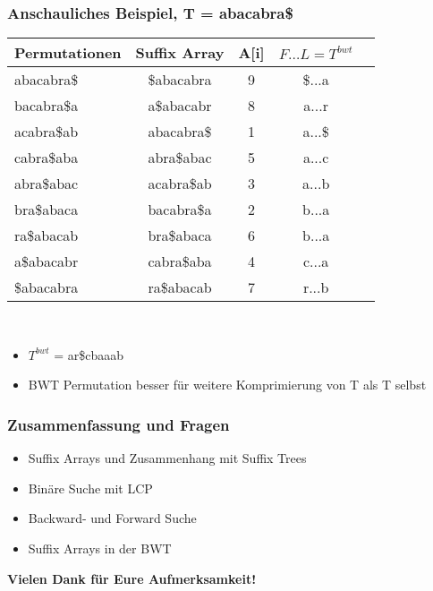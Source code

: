 \documentclass{beamer}
\begin{document}
\begin{frame}
\frametitle{Anschauliches Beispiel, T = \glqq abacabra\$\grqq}
\begin{tabular}{l<{\ttfamily} |c<{\ttfamily} |cc<{\ttfamily}| r<{\ttfamily}}
\textbf{Permutationen} & \textbf{Suffix Array} & A[i] & $F\ldots L = T^{bwt}$ \\\hline
abacabra\$ & \$\color{gray}abacabra &9& \$...a \\
bacabra\$\color{gray}a & a\$\color{gray}abacabr &8& a...r \\
acabra\$\color{gray}ab & abacabra\$ & 1&a...\$ \\
cabra\$\color{gray}aba & abra\$\color{gray}abac &5& a...c \\
abra\$\color{gray}abac & acabra\$\color{gray}ab &3& a...b \\
bra\$\color{gray}abaca & bacabra\$\color{gray}a & 2&b...a \\
ra\$\color{gray}abacab & bra\$\color{gray}abaca &6& b...a \\
a\$\color{gray}abacabr & cabra\$\color{gray}aba & 4&c...a \\
\$\color{gray}abacabra & ra\$\color{gray}abacab &7& r...b \\
\end{tabular}\\[5mm]
\begin{itemize}
\item $T^{bwt}$ = ar\$cbaaab
\item BWT Permutation besser für weitere Komprimierung von T als T selbst
\end{itemize}
\end{frame}

\begin{frame}
\frametitle{Zusammenfassung und Fragen}
\begin{itemize}
\item Suffix Arrays und Zusammenhang mit Suffix Trees
\item Binäre Suche mit LCP
\item Backward- und Forward Suche
\item Suffix Arrays in der BWT
\end{itemize}
\textbf{Vielen Dank für Eure Aufmerksamkeit!}
\end{frame}
\end{document}
